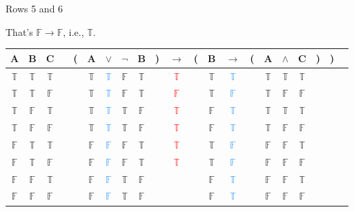 \documentclass[
  ignorenonframetext,
]{beamer}
\renewcommand{\,}{\text{, }}
\def\True{\mathbb{T}}
\def\False{\mathbb{F}}
\begin{document}
\begin{frame}{Rows 5 and 6}
\protect\hypertarget{rows-5-and-6}{}

That's \(\False \rightarrow \False\), i.e., \(\True\).

\begin{center}
\bigskip
\begin{tabular}{@{ }c@{ }@{ }c@{ }@{ }c | c@{ }@{}c@{}@{ }c@{ }@{ }c@{ }@{ }c@{ }@{ }c@{ }@{}c@{}@{ }c@{ }@{}c@{}@{ }c@{ }@{ }c@{ }@{}c@{}@{ }c@{ }@{ }c@{ }@{ }c@{ }@{}c@{}@{}c@{}@{ }c}
A & B & C &  & ( & A & $\vee$ & $\neg$ & B & ) & $\rightarrow$ & ( & B & $\rightarrow$ & ( & A & $\wedge$ & C & ) & ) & \\
\hline 
 $\True$ & $\True$ & $\True$ &  &  & $\True$ & \textcolor{dodgerblue}{$\True$} & $\False$ & $\True$ &  &\textcolor{red}{$\True$}&  & $\True$ & \textcolor{dodgerblue}{$\True$} &  & $\True$ & $\True$ & $\True$ &  &  & \\
 $\True$ & $\True$ & $\False$ &  &  & $\True$ & \textcolor{dodgerblue}{$\True$} & $\False$ & $\True$ &  &\textcolor{red}{$\False$}&  & $\True$ & \textcolor{dodgerblue}{$\False$} &  & $\True$ & $\False$ & $\False$ &  &  & \\
 $\True$ & $\False$ & $\True$ &  &  & $\True$ & \textcolor{dodgerblue}{$\True$} & $\True$ & $\False$ &  &\textcolor{red}{$\True$}&  & $\False$ & \textcolor{dodgerblue}{$\True$} &  & $\True$ & $\True$ & $\True$ &  &  & \\
 $\True$ & $\False$ & $\False$ &  &  & $\True$ & \textcolor{dodgerblue}{$\True$} & $\True$ & $\False$ &  &\textcolor{red}{$\True$}&  & $\False$ & \textcolor{dodgerblue}{$\True$} &  & $\True$ & $\False$ & $\False$ &  &  & \\
 $\False$ & $\True$ & $\True$ &  &  & $\False$ & \textcolor{dodgerblue}{$\False$} & $\False$ & $\True$ &  &\textcolor{red}{$\True$}&  & $\True$ & \textcolor{dodgerblue}{$\False$} &  & $\False$ & $\False$ & $\True$ &  &  & \\
 $\False$ & $\True$ & $\False$ &  &  & $\False$ & \textcolor{dodgerblue}{$\False$} & $\False$ & $\True$ &  &\textcolor{red}{$\True$}&  & $\True$ & \textcolor{dodgerblue}{$\False$} &  & $\False$ & $\False$ & $\False$ &  &  & \\
 $\False$ & $\False$ & $\True$ &  &  & $\False$ & \textcolor{dodgerblue}{$\False$} & $\True$ & $\False$ &  &&  & $\False$ & \textcolor{dodgerblue}{$\True$} &  & $\False$ & $\False$ & $\True$ &  &  & \\
 $\False$ & $\False$ & $\False$ &  &  & $\False$ & \textcolor{dodgerblue}{$\False$} & $\True$ & $\False$ &  &&  & $\False$ & \textcolor{dodgerblue}{$\True$} &  & $\False$ & $\False$ & $\False$ &  &  & \\
\end{tabular}
\bigskip
\end{center}

\end{frame}
\end{document}
